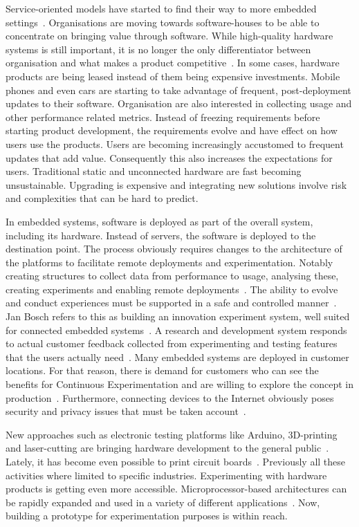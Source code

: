 \documentclass[english]{tktltiki2}
\begin{document}
Service-oriented models have started to find their way to more embedded settings~\cite{BE12, Bos12}. Organisations are moving towards software-houses to be able to concentrate on bringing value through software. While high-quality hardware systems is still important, it is no longer the only differentiator between organisation and what makes a product competitive~\cite{EHS14}. In some cases, hardware products are being leased instead of them being expensive investments. Mobile phones and even cars are starting to take advantage of frequent, post-deployment updates to their software. Organisation are also interested in collecting usage and other performance related metrics. Instead of freezing requirements before starting product development, the requirements evolve and have effect on how users use the products. Users are becoming increasingly accustomed to frequent updates that add value. Consequently this also increases the expectations for users. Traditional static and unconnected hardware are fast becoming unsustainable. Upgrading is expensive and integrating new solutions involve risk and complexities that can be hard to predict.

In embedded systems, software is deployed as part of the overall system, including its hardware. Instead of servers, the software is deployed to the destination point. The process obviously requires changes to the architecture of the platforms to facilitate remote deployments and experimentation. Notably creating structures to collect data from performance to usage, analysing these, creating experiments and enabling remote deployments~\cite{BE12}. The ability to evolve and conduct experiences must be supported in a safe and controlled manner~\cite{BE12}. Jan Bosch refers to this as building an innovation experiment system, well suited for connected embedded systems~\cite{BE12, Bos12}. A research and development system responds to actual customer feedback collected from experimenting and testing features that the users actually need~\cite{HAB12}. Many embedded systems are deployed in customer locations. For that reason, there is demand for customers who can see the benefits for Continuous Experimentation and are willing to explore the concept in production~\cite{HAB12}. Furthermore, connecting devices to the Internet obviously poses security and privacy issues that must be taken account~\cite{BE12}.

New approaches such as electronic testing platforms like Arduino, 3D-printing and laser-cutting are bringing hardware development to the general public~\cite{Arduino}. Lately, it has become even possible to print circuit boards~\cite{Vol15}. Previously all these activities where limited to specific industries. Experimenting with hardware products is getting even more accessible. Microprocessor-based architectures can be rapidly expanded and used in a variety of different applications~\cite{KRM13}. Now, building a prototype for experimentation purposes is within reach.
\end{document}
